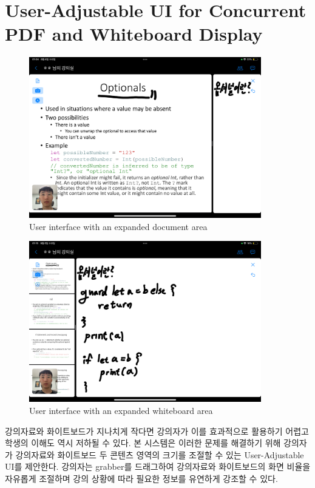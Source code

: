 \documentclass[pdflatex,sn-mathphys-num]{sn-jnl}%
\theoremstyle{thmstyleone}%
\theoremstyle{thmstyletwo}%
\theoremstyle{thmstylethree}%
\begin{document}
\section{User-Adjustable UI for Concurrent PDF and Whiteboard Display}\label{sec2}

\begin{figure}[p]
\centering
\includegraphics[width=0.9\textwidth]{UserInterfaceWithAnExpandedDocumentArea.PNG}
\caption{User interface with an expanded document area}\label{fig1}
\end{figure}

\begin{figure}[p]
\centering
\includegraphics[width=0.9\textwidth]{UserInterfaceWithAnExpandedWhiteboardArea.PNG}
\caption{User interface with an expanded whiteboard area}\label{fig2}
\end{figure}

강의자료와 화이트보드가 지나치게 작다면 강의자가 이를 효과적으로 활용하기 어렵고 학생의 이해도 역시 저하될 수 있다. 본 시스템은 이러한 문제를 해결하기 위해 강의자가 강의자료와 화이트보드 두 콘텐츠 영역의 크기를 조절할 수 있는 User-Adjustable UI를 제안한다. 강의자는 grabber를 드래그하여 강의자료와 화이트보드의 화면 비율을 자유롭게 조절하며 강의 상황에 따라 필요한 정보를 유연하게 강조할 수 있다.
\end{document}
